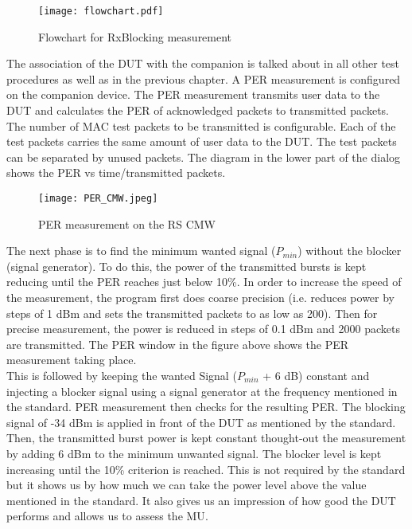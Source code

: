  \begin{figure}[H]
\centering
\texttt{[image: flowchart.pdf]}
\caption{Flowchart for \ac{RxBlocking} measurement}
\label{fig:flowchartrxvlock}
\end{figure}

The association of the \acs{DUT} with the companion is talked about in all other test procedures as well as in the previous chapter. A \acf{PER} measurement is configured on the companion device. The \acs{PER} measurement transmits user data to the \acs{DUT} and calculates the \acs{PER} of acknowledged packets to transmitted packets. The number of MAC test packets to be transmitted is configurable. Each of the test packets carries the same amount of user data to the \acs{DUT}. The test packets can be separated by unused packets. The diagram in the lower part of the dialog shows the \acs{PER} vs time/transmitted packets.

 \begin{figure}[H]
\centering
\texttt{[image: PER\_CMW.jpeg]}
\caption{\ac{PER} measurement on the \acs{RS} \acs{CMW}}
\label{fig:per}
\end{figure}

The next phase is to find the minimum wanted signal ($P_{min}$) without the blocker (signal generator). To do this, the power of the transmitted bursts is kept reducing until the \acs{PER} reaches just below 10\%. In order to increase the speed of the measurement, the program first does coarse precision (i.e. reduces power by steps of 1 dBm and sets the transmitted packets to as low as 200). Then for precise measurement, the power is reduced in steps of 0.1 dBm and 2000 packets are transmitted. The \acs{PER} window in the figure above shows the \acs{PER} measurement taking place. \\
  
This is followed by keeping the wanted Signal ($P_{min}$ + 6 dB) constant and injecting a blocker signal using a signal generator at the frequency mentioned in the standard. \acs{PER} measurement then checks for the resulting \acs{PER}. The blocking signal of -34 dBm is applied in front of the \acs{DUT} as mentioned by the standard. Then, the transmitted burst power is kept constant thought-out the measurement by adding 6 dBm to the minimum unwanted signal. The blocker level is kept increasing until the 10\% criterion is reached. This is not required by the standard but it shows us by how much we can take the power level above the value mentioned in the standard. It also gives us an impression of how good the \acs{DUT} performs and allows us to assess the \acf{MU}.




